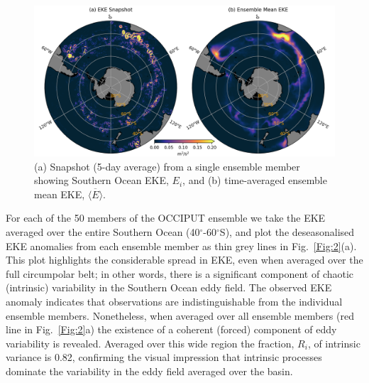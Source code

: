 \documentclass[linenumbers]{agujournal2019}
\begin{document}
\begin{figure}[ht]
\begin{center}
\includegraphics[width=\hsize]{Figure1}
\caption{(a) Snapshot (5-day average) from a single ensemble member showing Southern Ocean EKE, $E_i$, and (b) time-averaged ensemble mean EKE, $\overline{\langle E \rangle}$.}
\label{Fig:1}
\end{center}
\end{figure}

For each of the 50 members of the OCCIPUT ensemble we take the EKE averaged over the entire Southern Ocean (40$^\circ$-60$^\circ$S), and plot the deseasonalised EKE anomalies from each ensemble member as thin grey lines in Fig.~\ref{Fig:2}(a). 
This plot highlights the considerable spread in EKE, even when averaged over the full circumpolar belt; in other words, there is a significant component of chaotic (intrinsic) variability in the Southern Ocean eddy field.
The observed EKE anomaly \citep[calculated using data from ][ and filtered using the same methods as model output]{Martinez-Moreno2022} indicates that observations are indistinguishable from the individual ensemble members.
Nonetheless, when averaged over all ensemble members (red line in Fig.~\ref{Fig:2}a) the existence of a coherent (forced) component of eddy variability is revealed.
Averaged over this wide region the fraction, $R_i$, of intrinsic variance is 0.82, confirming the visual impression that intrinsic processes dominate the variability in the eddy field averaged over the basin.
\end{document}
